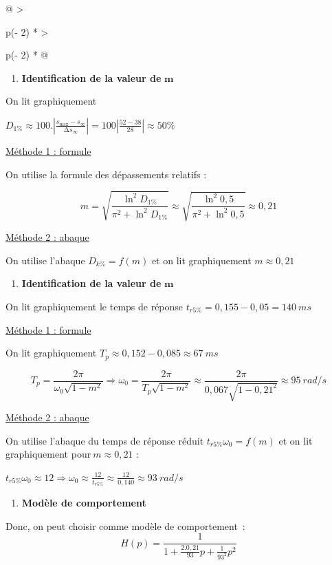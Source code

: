 \begin{longtable}[]{@{}
  >{\raggedright\arraybackslash}p{(\columnwidth - 2\tabcolsep) * }
  >{\raggedright\arraybackslash}p{(\columnwidth - 2\tabcolsep) * }@{}}
\begin{minipage}[b]{\linewidth}
\begin{enumerate}
\def\labelenumi{\arabic{enumi}.}
\setcounter{enumi}{2}
\item
  \textbf{Identification de la valeur de} \(\mathbf{m}\)
\end{enumerate}

On lit graphiquement

\(D_{1\%} \approx 100.\left| \frac{s_{\max} - s_{\infty}}{{\mathrm{\Delta}s}_{\infty}} \right| = 100\left| \frac{52 - 38}{28} \right| \approx 50\%\)

\ul{Méthode 1 : formule}

On utilise la formule des dépassements relatifs :

\[m = \sqrt{\frac{\ln^{2}D_{1\%}}{\pi^{2} + \ln^{2}D_{1\%}}} \approx \sqrt{\frac{\ln^{2}0,5}{\pi^{2} + \ln^{2}0,5}} \approx 0,21\]

\ul{Méthode 2 : abaque}

On utilise l'abaque \(D_{k\%} = f(m)\) et on lit graphiquement \(m \approx 0,21\)

\begin{enumerate}
\def\labelenumi{\arabic{enumi}.}
\setcounter{enumi}{3}
\item
  \textbf{Identification de la valeur de} \(\mathbf{m}\)
\end{enumerate}

On lit graphiquement le temps de réponse \(t_{r5\%} = 0,155 - 0,05 = 140\ ms\)

\ul{Méthode 1 : formule}

On lit graphiquement \(T_{p} \approx 0,152 - 0,085 \approx 67\ ms\)

\[T_{p} = \frac{2\pi}{\omega_{0}\sqrt{1 - m^{2}}} \Longrightarrow \omega_{0} = \frac{2\pi}{T_{p}\sqrt{1 - m^{2}}} \approx \frac{2\pi}{0,067\sqrt{1 - {0,21}^{2}}} \approx 95\ rad/s\]

\ul{Méthode 2 : abaque}

On utilise l'abaque du temps de réponse réduit \(t_{r5\%}\omega_{0} = f(m)\) et on lit graphiquement pour\(\ m \approx 0,21\) :

\(t_{r5\%}\omega_{0} \approx 12 \Longrightarrow \omega_{0} \approx \frac{12}{t_{r5\%}} \approx \frac{12}{0,140} \approx 93\ rad/s\)

\begin{enumerate}
\def\labelenumi{\arabic{enumi}.}
\setcounter{enumi}{4}
\item
  \textbf{Modèle de comportement}
\end{enumerate}

Donc, on peut choisir comme modèle de comportement~: \emph{\hfill\break
}\[H(p) = \frac{1}{1 + \frac{2.0,21}{93}p + \frac{1}{93^{2}}p^{2}}\]\strut
\end{minipage} \\
\midrule\noalign{}
\endhead
\bottomrule\noalign{}
\endlastfoot
\end{longtable}

